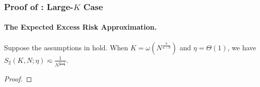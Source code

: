 \subsubsection{Proof of : Large-$K$ Case}
\paragraph{The Expected Excess Risk Approximation.}
\begin{lemma} \label{lem:one-hot-loss-estimate-large-K}
    Suppose the assumptions in  hold. When $K = \omega(N^{\frac{b}{a-b}})$ and $\eta = \Theta(1)$, we have $S_2(K, N;\eta) \eqsim \frac{1}{N^{\frac{a-1}{a-b}}}$.
\end{lemma}
\begin{proof}


\end{proof}
